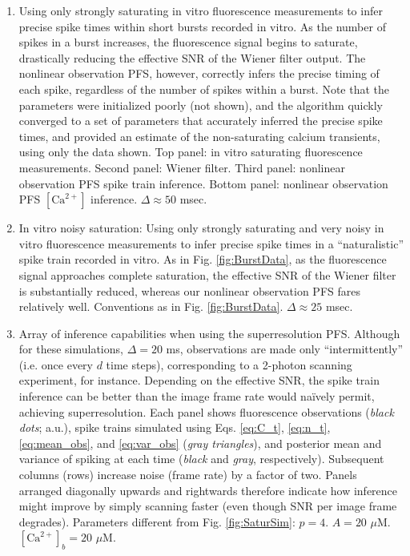 \documentclass[10pt]{article}
\newcommand{\Ca}{[\text{Ca}^{2+}]}
\begin{document}
\begin{enumerate}
\item Using only strongly saturating in vitro fluorescence measurements to infer precise spike times within short bursts recorded in vitro. As the number of spikes in a burst increases, the fluorescence signal begins to saturate, drastically reducing the effective SNR of the Wiener filter output. The nonlinear observation PFS, however, correctly infers the precise timing of each spike, regardless of the number of spikes within a burst. Note that the parameters were initialized poorly (not shown), and the algorithm quickly converged to a set of parameters that accurately inferred the precise spike times, and provided an estimate of the non-saturating calcium transients, using only the data shown. Top panel: in vitro saturating fluorescence measurements. Second panel: Wiener filter.  Third panel: nonlinear observation PFS spike train inference.  Bottom panel: nonlinear observation PFS $\Ca$ inference. $\Delta \approx 50$ msec. 
\item In vitro noisy saturation: Using only strongly saturating and very noisy in vitro fluorescence measurements to infer precise spike times in a ``naturalistic'' spike train recorded in vitro.  As in Fig. \ref{fig:BurstData}, as the fluorescence signal approaches complete saturation, the effective SNR of the Wiener filter is substantially reduced, whereas our nonlinear observation PFS fares relatively well.  Conventions as in Fig. \ref{fig:BurstData}. $\Delta \approx 25$ msec.
\item Array of inference capabilities when using the superresolution PFS.  Although for these simulations, $\Delta=20$ ms, observations are made only ``intermittently'' (i.e. once every $d$ time steps), corresponding to a 2-photon scanning experiment, for instance. Depending on the effective SNR, the spike train inference can be better than the image frame rate would na\"{i}vely permit, achieving superresolution.  Each panel shows fluorescence observations (\emph{black dots}; a.u.), spike trains simulated using Eqs. \ref{eq:C_t}, \ref{eq:n_t}, \ref{eq:mean_obs}, and \ref{eq:var_obs} (\emph{gray triangles}), and posterior mean and variance of spiking at each time (\emph{black} and \emph{gray}, respectively). Subsequent columns (rows) increase noise (frame rate) by a factor of two. Panels arranged diagonally upwards and rightwards therefore indicate how inference might improve by simply scanning faster (even though SNR per image frame degrades). Parameters different from Fig. \ref{fig:SaturSim}: $p=4$. $A=20$ $\mu$M. $\Ca_b=20$ $\mu$M.  

\end{enumerate}
\end{document}
